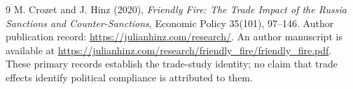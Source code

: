 \documentclass[11pt,a4paper]{article}
\begin{document}
\begin{thebibliography}{9}
 M. Crozet and J. Hinz (2020), \emph{Friendly Fire: The Trade Impact of the Russia Sanctions and Counter-Sanctions}, Economic Policy 35(101), 97--146. Author publication record: \url{https://julianhinz.com/research/}. An author manuscript is available at \url{https://julianhinz.com/research/friendly_fire/friendly_fire.pdf}. These primary records establish the trade-study identity; no claim that trade effects identify political compliance is attributed to them.
\end{thebibliography}
\end{document}
